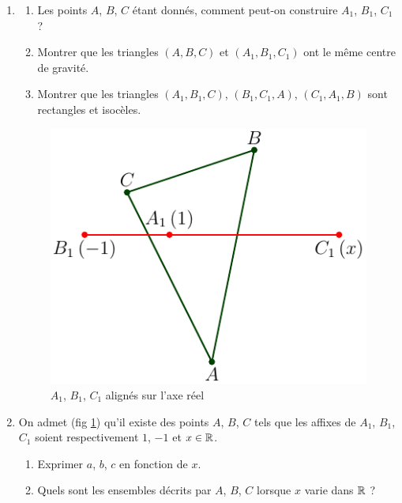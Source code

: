 \begin{enumerate}
 \item 
\begin{enumerate}
 \item Les points $A$, $B$, $C$ étant donnés, comment peut-on construire $A_1$, $B_1$, $C_1$ ?
 \item Montrer que les triangles $(A, B, C)$ et $(A_1, B_1, C_1)$ ont le même centre de gravité.
 \item Montrer que les triangles $(A_1,B_1,C)$, $(B_1,C_1,A)$, $(C_1,A_1,B)$ sont rectangles et isocèles.
\end{enumerate}

\begin{figure}[h!t]
 \centering
 \includegraphics{./Ecomp12_2.pdf}
 \caption{$A_1$, $B_1$, $C_1$ alignés sur l'axe réel}
 \label{fig:Ecomp12_2}
\end{figure}

\item On admet (fig \ref{fig:Ecomp12_2}) qu'il existe des points $A$, $B$, $C$ tels que les affixes de $A_1$, $B_1$, $C_1$ soient respectivement $1$, $-1$ et $x\in\mathbb{R}$.
\begin{enumerate}
\item Exprimer $a$, $b$, $c$ en fonction de $x$.
\item Quels sont les ensembles décrits par $A$, $B$, $C$ lorsque $x$ varie dans $\mathbb{R}$ ?
\end{enumerate}


\end{enumerate}
